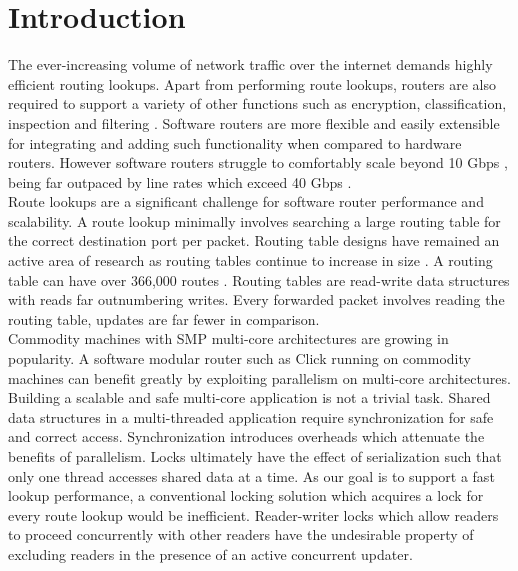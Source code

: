 \documentclass[a4paper,marginparwidth=50pt,marginparsep=10pt]{article}
\begin{document}
\section{Introduction}
The ever-increasing volume of network traffic over the internet demands highly efficient routing lookups. Apart from performing route lookups, routers are also required to support a variety of other functions such as encryption, classification, inspection and filtering \cite{routebricks}. Software routers are more flexible and easily extensible for integrating and adding such functionality when compared to hardware routers. However software routers struggle to comfortably scale beyond 10 Gbps \cite{routebricks}, being far outpaced by line rates which exceed 40 Gbps \cite{attlinkrate}.\\

Route lookups are a significant challenge for software router performance and scalability. A route lookup minimally involves searching a large routing table for the correct destination port per packet. Routing table designs have remained an active area of research \cite{fastrtable1,fastrtable2,fastrtable3} as routing tables continue to increase in size \cite{incrtablesize}. A routing table can have over 366,000 routes \cite{routeviews}. Routing tables are read-write data structures with reads far outnumbering writes. Every forwarded packet involves reading the routing table, updates are far fewer in comparison. \\

Commodity machines with SMP multi-core architectures are growing in popularity. A software modular router such as Click \cite{click} running on commodity machines  can benefit greatly by exploiting parallelism on multi-core architectures. Building a scalable and safe multi-core application is not a trivial task. Shared data structures in a multi-threaded application require synchronization for safe and correct access. Synchronization introduces overheads which attenuate the benefits of parallelism. Locks ultimately have the effect of  serialization such that only one thread accesses shared data at a time. As our goal is to support a fast lookup performance, a conventional locking solution which acquires a lock for every route lookup would be inefficient. Reader-writer locks which allow readers to proceed concurrently with other readers have the undesirable property of excluding readers in the presence of an active concurrent updater.\\
\end{document}
